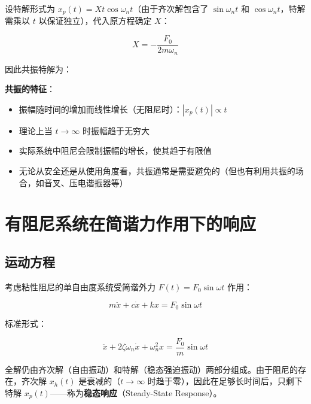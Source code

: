 设特解形式为 $x_p(t) = X t\cos\omega_n t$（由于齐次解包含了 $\sin\omega_n t$ 和 $\cos\omega_n t$，特解需乘以 $t$ 以保证独立），代入原方程确定 $X$：
\begin{myformula}
    \[
    X = -\frac{F_0}{2m\omega_n}
    \]
\end{myformula}

因此共振特解为：
\begin{myformula}
    \end{myformula}

\textbf{共振的特征}：
\begin{itemize}
    \item 振幅随时间的增加而线性增长（无阻尼时）：$|x_p(t)| \propto t$
    \item 理论上当 $t \to \infty$ 时振幅趋于无穷大
    \item 实际系统中阻尼会限制振幅的增长，使其趋于有限值
    \item 无论从安全还是从使用角度看，共振通常是需要避免的（但也有利用共振的场合，如音叉、压电谐振器等）
\end{itemize}

\section{有阻尼系统在简谐力作用下的响应}

\subsection{运动方程}

考虑粘性阻尼的单自由度系统受简谐外力 $F(t) = F_0\sin\omega t$ 作用：
\begin{myformula}
    \[
    m\ddot{x} + c\dot{x} + kx = F_0\sin\omega t
    \]
\end{myformula}

标准形式：
\begin{myformula}
    \[
    \ddot{x} + 2\zeta\omega_n\dot{x} + \omega_n^2 x = \frac{F_0}{m}\sin\omega t
    \]
\end{myformula}

全解仍由齐次解（自由振动）和特解（稳态强迫振动）两部分组成。由于阻尼的存在，齐次解 $x_h(t)$ 是衰减的（$t \to \infty$ 时趋于零），因此在足够长时间后，只剩下特解 $x_p(t)$——称为\textbf{稳态响应}（Steady-State Response）。

